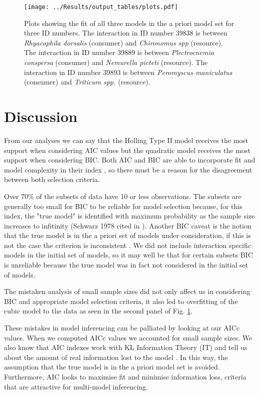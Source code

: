 \documentclass[11pt]{article}
\begin{document}
  \begin{figure}[h]
    \centering
    \texttt{[image: ../Results/output\_tables/plots.pdf]}
    \caption{Plots showing the fit of all three models in the a priori model set for three ID numbers. The interaction in ID number 39838 is between \emph{Rhyacophila dorsalis} (consumer) and \emph{Chironomus spp} (resource). The interaction in ID number 39889 is between \emph{Plectrocnemia conspersa} (consumer) and \emph{Nemurella picteti} (resource). The interaction in ID number 39893 is between \emph{Peromyscus maniculatus} (consumer) and \emph{Triticum spp.} (resource).}
    \label{fig:egplots}
  \end{figure}

  \section{Discussion}
  
  From our analyses we can say that the Holling Type II model receives the most support when considering AIC values but the quadratic model receives the most support when considering BIC. Both AIC and BIC are able to incorporate fit and model complexity in their index \cite{JohnsonOmland2004}, so there must be a reason for the disagreement between both selection criteria.

  Over 70\% of the subsets of data have 10 or less observations. The subsets are generally too small for BIC to be reliable for model selection because, for this index, the "true model" is identified with maximum probability as the sample size increases to infitinity (Schwarz 1978 cited in \cite{Burnham2011}). Another BIC caveat is the notion that the true model is in the a priori set of models under consideration, if this is not the case the criterion is inconsistent \cite{Burnham2011}. We did not include interaction specific models in the initial set of models, so it may well be that for certain subsets BIC is unreliable because the true model was in fact not considered in the initial set of models.

  The mistaken analysis of small sample sizes did not only affect us in considering BIC and appropriate model selection criteria, it also led to overfitting of the cubic model to the data as seen in the second panel of Fig. \ref{fig:egplots}.

  These mistakes in model inferencing can be palliated by looking at our AICc values. When we computed AICc values we accounted for small sample sizes. We also know that AIC indexes work with KL Information Theory (IT) and tell us about the amount of real information lost to the model \cite{JohnsonOmland2004}. In this way, the assumption that the true model is in the a priori model set is avoided. Furthermore, AIC looks to maximise fit and minimise information loss, criteria that are attractive for multi-model inferencing.
\end{document}

